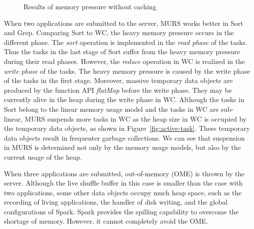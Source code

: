 \begin{figure*}[!t]
\centering
{}
\vspace*{-2mm}
\caption{Results of memory pressure without caching}
\vspace*{-4mm}
\label{fig:pressurewithoutcache}
\end{figure*}

When two applications are submitted to the server, MURS works better in Sort and Grep. Comparing Sort to WC, the heavy memory pressure occurs in the different phase. The \textit{sort} operation is implemented in the \textit{read phase} of the tasks. Thus the tasks in the last stage of Sort suffer from the heavy memory pressure during their read phases. However, the \textit{reduce} operation in WC is realized in the \textit{write phase} of the tasks. The heavy memory pressure is caused by the write phase of the tasks in the first stage. Moreover, massive temporary data objects are produced by the function API \textit{flatMap} before the write phase. They may be currently alive in the heap during the write phase in WC. Although the tasks in Sort belong to the linear memory usage model and the tasks in WC are sub-linear, MURS suspends more tasks in WC as the heap size in WC is occupied by the temporary data objects, as shown in Figure~\ref{fig:active-task}. These temporary data objects result in frequenter garbage collections. We can see that suspension in MURS is determined not only by the memory usage models, but also by the current usage of the heap. 

When three applications are submitted, out-of-memory (OME) is thrown by the server. Although the live shuffle buffer in this case is smaller than the case with two applications, some other data objects occupy much heap space, such as the recording of living applications, the handler of disk writing, and the global configurations of Spark. Spark provides the spilling capability to overcome the shortage of memory. However, it cannot completely avoid the OME.

